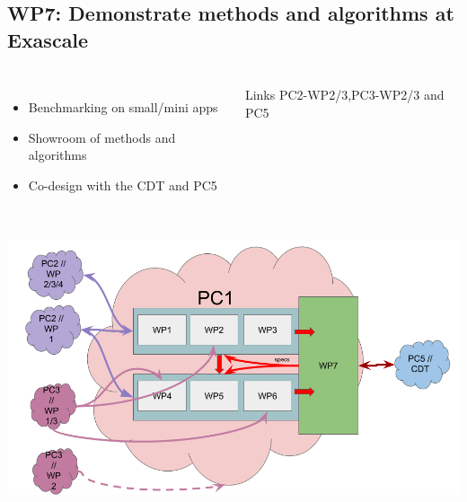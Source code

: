 \subsection{WP7: Demonstrate methods and algorithms at Exascale}
\begin{frame}
  \frametitle{\insertsectionhead}
  \framesubtitle{\insertsubsectionhead}

  \begin{columns}
    \begin{itemize}
      \item Benchmarking on small/mini apps 
      \item Showroom of methods and algorithms
      \item Co-design with the CDT and PC5
    \end{itemize}
    \begin{alertblock}{Links}
      PC2-WP2/3,PC3-WP2/3 and PC5
    \end{alertblock}
   
  \end{columns}
\end{frame}

\begin{frame}[plain]
  \frametitle{}
  \framesubtitle{}

  \begin{center}
    \includegraphics[width=.9\linewidth]{../../figures/exama-pc.png}
  \end{center}

  

\end{frame}


